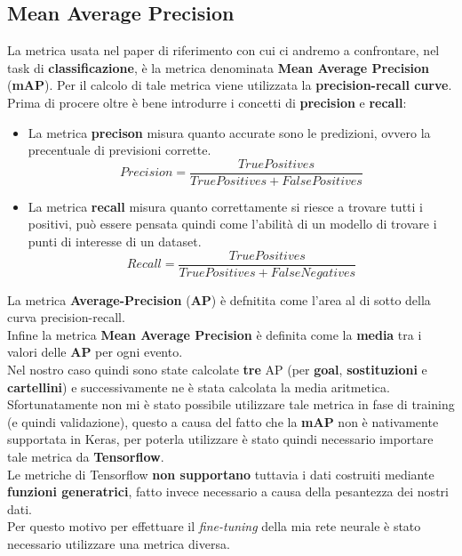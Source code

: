 \subsection{Mean Average Precision}
La metrica usata nel paper di riferimento con cui ci andremo a confrontare, nel task di \textbf{classificazione}, è la metrica denominata \textbf{Mean Average Precision} (\textbf{mAP}). Per il calcolo di tale metrica viene utilizzata la \textbf{precision-recall curve}.
\\Prima di procere oltre è bene introdurre i concetti di \textbf{precision} e \textbf{recall}:
\begin{itemize}
\item La metrica \textbf{precison} misura quanto accurate sono le predizioni, ovvero la precentuale di previsioni corrette.
\begin{equation}
Precision=\frac{True Positives}{True Positives + False Positives}
\label{Precision}
\end{equation}
\item La metrica \textbf{recall} misura quanto correttamente si riesce a trovare tutti i positivi, può essere pensata quindi come l'abilità di un modello di trovare i punti di interesse di un dataset.
\begin{equation}
Recall=\frac{True Positives}{True Positives + False Negatives}
\label{Recall}
\end{equation}
\end{itemize}
La metrica \textbf{Average-Precision} (\textbf{AP}) è defnitita come l'area al di sotto della curva precision-recall.
\\Infine la metrica \textbf{Mean Average Precision} è definita come la \textbf{media} tra i valori delle \textbf{AP} per ogni evento. 
\\Nel nostro caso quindi sono state calcolate \textbf{tre} AP (per \textbf{goal}, \textbf{sostituzioni} e \textbf{cartellini}) e successivamente ne è stata calcolata la media aritmetica.
\\Sfortunatamente non mi è stato possibile utilizzare tale metrica in fase di training (e quindi validazione), questo a causa del fatto che la \textbf{mAP} non è nativamente supportata in Keras, per poterla utilizzare è stato quindi necessario importare tale metrica da \textbf{Tensorflow}.
\\Le metriche di Tensorflow \textbf{non supportano} tuttavia i dati costruiti mediante \textbf{funzioni generatrici}, fatto invece necessario a causa della pesantezza dei nostri dati.
\\Per questo motivo per effettuare il \textit{fine-tuning} della mia rete neurale è stato necessario utilizzare una metrica diversa.
